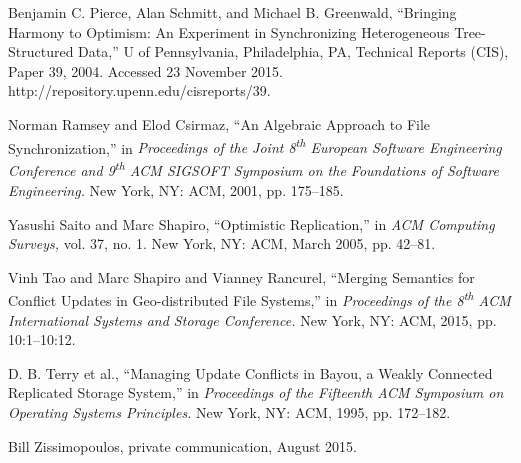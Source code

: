 Benjamin C. Pierce, Alan Schmitt, and Michael B. Greenwald, 
``Bringing Harmony to Optimism: An Experiment in Synchronizing Heterogeneous Tree-Structured Data,''
U of Pennsylvania,
Philadelphia, PA,
Technical Reports (CIS),
Paper 39,
2004.
Accessed 23 November 2015.\\
http://repository.upenn.edu/cis\undersc reports/39.

Norman Ramsey and Elod Csirmaz,
``An Algebraic Approach to File Synchronization,''
in \emph{Proceedings of the Joint 8\textsuperscript{th} European Software Engineering Conference 
and 9\textsuperscript{th} ACM SIGSOFT Symposium on the Foundations of Software Engineering.}
New York, NY: ACM, 2001, pp. 175--185.

Yasushi Saito and Marc Shapiro,
``Optimistic Replication,''
in \emph{ACM Computing Surveys,}
vol. 37, no. 1.
New York, NY: ACM, March 2005,
pp. 42--81.

Vinh Tao and Marc Shapiro and Vianney Rancurel,
``Merging Semantics for Conflict Updates in Geo-distributed File Systems,''
in \emph{Proceedings of the 8\textsuperscript{th}
 ACM International Systems and Storage Conference.}
New York, NY: ACM, 2015, pp. 10:1--10:12.

D. B. Terry et al.,
``Managing Update Conflicts in Bayou, a Weakly Connected Replicated Storage System,''
in \emph{Proceedings of the Fifteenth ACM Symposium on Operating Systems Principles.}
New York, NY: ACM, 1995, pp. 172--182.

Bill Zissimopoulos, private communication, August 2015.
